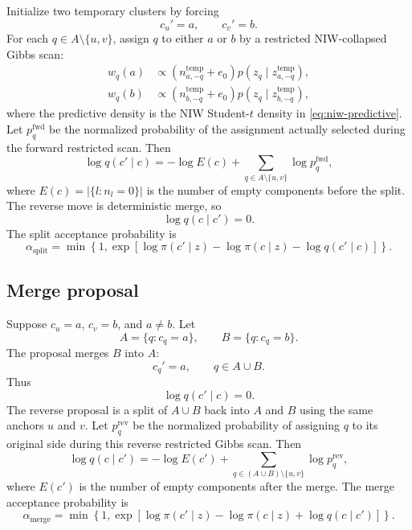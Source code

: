 \documentclass[11pt]{article}
\begin{document}
Initialize two temporary clusters by forcing
\[
    c_u'=a,
    \qquad
    c_v'=b.
\]
For each $q\in A\setminus\{u,v\}$, assign $q$ to either $a$ or $b$ by a
restricted NIW-collapsed Gibbs scan:
\begin{align}
    w_q(a)&\propto
    (n_{a,-q}^{\mathrm{temp}}+e_0)
    p(z_q\mid z_{a,-q}^{\mathrm{temp}}),\\
    w_q(b)&\propto
    (n_{b,-q}^{\mathrm{temp}}+e_0)
    p(z_q\mid z_{b,-q}^{\mathrm{temp}}),
\end{align}
where the predictive density is the NIW Student-$t$ density in
\eqref{eq:niw-predictive}.  Let $p_q^{\mathrm{fwd}}$ be the normalized
probability of the assignment actually selected during the forward restricted
scan.  Then
\begin{equation}
    \log q(c'\mid c)
    =
    -\log E(c)
    +
    \sum_{q\in A\setminus\{u,v\}}\log p_q^{\mathrm{fwd}},
    \label{eq:split-forward-probability}
\end{equation}
where $E(c)=|\{l:n_l=0\}|$ is the number of empty components before the split.
The reverse move is deterministic merge, so
\[
    \log q(c\mid c')=0.
\]
The split acceptance probability is
\begin{equation}
    \alpha_{\mathrm{split}}
    =
    \min\left\{1,
    \exp\left[
    \log\pi(c'\mid z)-\log\pi(c\mid z)
    -\log q(c'\mid c)
    \right]
    \right\}.
    \label{eq:split-acceptance}
\end{equation}

\subsection{Merge proposal}

Suppose $c_u=a$, $c_v=b$, and $a\neq b$.  Let
\[
    A=\{q:c_q=a\},
    \qquad
    B=\{q:c_q=b\}.
\]
The proposal merges $B$ into $A$:
\[
    c_q'=a,
    \qquad q\in A\cup B.
\]
Thus
\[
    \log q(c'\mid c)=0.
\]
The reverse proposal is a split of $A\cup B$ back into $A$ and $B$ using the
same anchors $u$ and $v$.  Let $p_q^{\mathrm{rev}}$ be the normalized
probability of assigning $q$ to its original side during this reverse
restricted Gibbs scan.  Then
\begin{equation}
    \log q(c\mid c')
    =
    -\log E(c')
    +
    \sum_{q\in(A\cup B)\setminus\{u,v\}}\log p_q^{\mathrm{rev}},
    \label{eq:merge-reverse-probability}
\end{equation}
where $E(c')$ is the number of empty components after the merge.  The merge
acceptance probability is
\begin{equation}
    \alpha_{\mathrm{merge}}
    =
    \min\left\{1,
    \exp\left[
    \log\pi(c'\mid z)-\log\pi(c\mid z)
    +\log q(c\mid c')
    \right]
    \right\}.
    \label{eq:merge-acceptance}
\end{equation}
\end{document}
